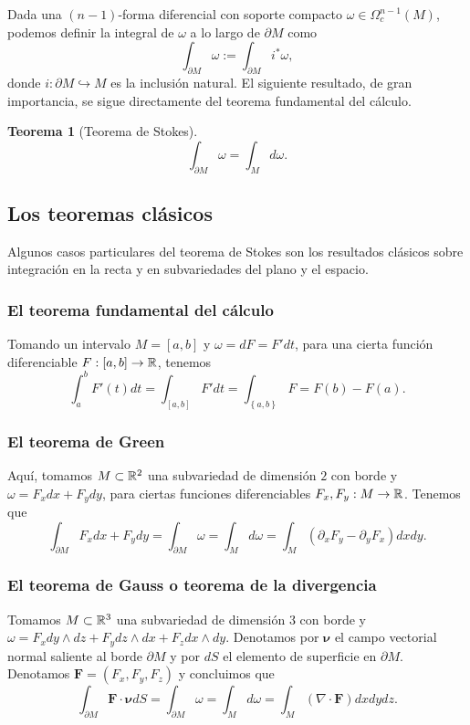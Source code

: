 \documentclass[11pt,a4paper]{amsbook}
\newtheorem{thm}[subsection]{Teorema}
\theoremstyle{remark} \newtheorem{rmk}[subsection]{Observación}
\theoremstyle{definition} \newtheorem{defn}[subsection]{Definición}
\theoremstyle{definition} \newtheorem{ex}[subsection]{Ejemplo}
\theoremstyle{definition} \newtheorem{ej}[subsection]{Ejercicio}
\begin{document}
Dada una $(n-1)$-forma diferencial con soporte compacto $\omega \in \Omega^{n-1}_c(M)$, podemos definir la integral de $\omega$ a lo largo de $\partial M$ como
\begin{equation*}
\int_{\partial M} \omega := \int_{\partial M} i^*\omega,
\end{equation*}
donde $i:\partial M \hookrightarrow M$ es la inclusión natural. El siguiente resultado, de gran importancia, se sigue directamente del teorema fundamental del cálculo.

\begin{thm}[Teorema de Stokes]
\begin{equation*}
\int_{\partial M} \omega = \int_M d\omega.
\end{equation*}
\end{thm}

\subsection{Los teoremas clásicos} Algunos casos particulares del teorema de Stokes son los resultados clásicos sobre integración en la recta y en subvariedades del plano y el espacio.

\subsubsection{El teorema fundamental del cálculo} Tomando un intervalo $M=[a,b]$ y $\omega = dF = F' dt$, para una cierta función diferenciable $F:[a,b]\rightarrow \mathbb R$, tenemos
\begin{equation*}
\int_a^b F'(t) dt = \int_{[a,b]} F' dt = \int_{\left\{ a,b \right\}} F = F(b)- F(a).
\end{equation*}

\subsubsection{El teorema de Green} Aquí, tomamos $M\subset \mathbb R^2$ una subvariedad de dimensión $2$ con borde y $\omega= F_x dx + F_y dy$, para ciertas funciones diferenciables $F_x,F_y:M\rightarrow \mathbb R$. Tenemos que
\begin{equation*}
\int_{\partial M} F_x dx + F_y dy =  \int_{\partial M} \omega = \int_M d\omega = \int_M (\partial_x F_y - \partial_y F_x) dx dy.
\end{equation*}

\subsubsection{El teorema de Gauss o teorema de la divergencia} Tomamos $M\subset \mathbb R^3$ una subvariedad de dimensión $3$ con borde y $\omega= F_x dy\wedge dz + F_y dz\wedge dx + F_z dx \wedge dy$. Denotamos por $\bm{\nu}$ el campo vectorial normal saliente al borde $\partial M$ y por $dS$ el elemento de superficie en $\partial M$. Denotamos $\bm{F}=(F_x,F_y,F_z)$ y concluimos que
\begin{equation*}
\int_{\partial M} \bm{F} \cdot \bm{\nu} dS = \int_{\partial M} \omega = \int_M d\omega = \int_M (\nabla \cdot \bm{F}) dxdydz.
\end{equation*}
\end{document}

